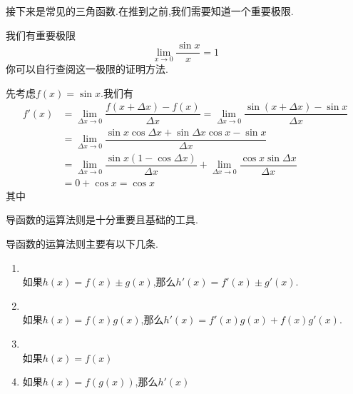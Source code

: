 \documentclass{ctexart}
\begin{document}
接下来是常见的三角函数.在推到之前,我们需要知道一个重要极限.
\begin{theorem}[0A.1.3 重要极限I]
    我们有重要极限
    \[\lim_{x\to0}\dfrac{\sin x}{x}=1\]
    你可以自行查阅这一极限的证明方法.
\end{theorem}
\begin{derivation}
    先考虑$f(x)=\sin x$.我们有
    \[\begin{aligned}
        f'(x)
        &= \lim_{\Delta x\to0}\dfrac{f(x+\Delta x)-f(x)}{\Delta x}=\lim_{\Delta x\to0}\dfrac{\sin(x+\Delta x)-\sin{x}}{\Delta x} \\
        &= \lim_{\Delta x\to0}\dfrac{\sin x\cos\Delta x+\sin\Delta x\cos x-\sin x}{\Delta x} \\
        &= \lim_{\Delta x\to0}\dfrac{\sin x(1-\cos\Delta x)}{\Delta x}+\lim_{\Delta x\to0}\dfrac{\cos x\sin\Delta x}{\Delta x} \\
        &= 0+\cos x=\cos x
    \end{aligned}\]
    其中
\end{derivation}
\indent 导函数的运算法则是十分重要且基础的工具.
\begin{theorem}[0A.1.2]
    导函数的运算法则主要有以下几条.
    \begin{enumerate}[label=\tbf{\roman*.},topsep=0pt,parsep=0pt,itemsep=0pt,partopsep=0pt]
        \item {}\\如果$h(x)=f(x)\pm g(x)$,那么$h'(x)=f'(x)\pm g'(x)$.
        \item {}\\如果$h(x)=f(x)g(x)$,那么$h'(x)=f'(x)g(x)+f(x)g'(x)$.
        \item {}\\如果$h(x)=f(x)$
        \item 如果$h(x)=f(g(x))$,那么$h'(x)$
    \end{enumerate}
\end{theorem}
\end{document}
